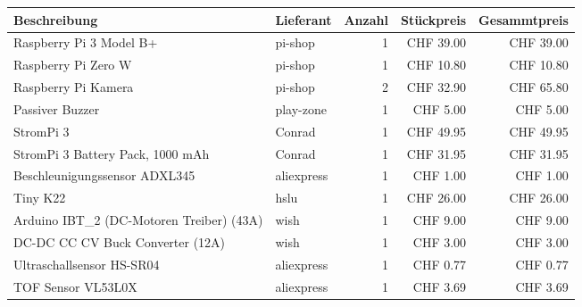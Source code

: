\documentclass[../../main.tex]{subfiles}
\begin{document}
\begin{table}[H]
    \centering
    \begin{tabular}{|p{6cm}|l|r|r|r|}
    \hline
    \textbf{Beschreibung}                                   & \textbf{Lieferant} & \textbf{Anzahl} & \textbf{Stückpreis} & \textbf{Gesammtpreis} \\ \hline 
    Raspberry Pi 3 Model B+                                 & pi-shop            & 1               & CHF 39.00           & CHF 39.00             \\ \hline 
    Raspberry Pi Zero W                                     & pi-shop            & 1               & CHF 10.80           & CHF 10.80             \\ \hline 
    Raspberry Pi Kamera                                     & pi-shop            & 2               & CHF 32.90           & CHF 65.80             \\ \hline 
    Passiver Buzzer                                         & play-zone          & 1               & CHF 5.00            & CHF 5.00              \\ \hline 
    StromPi 3                                               & Conrad             & 1               & CHF 49.95           & CHF 49.95             \\ \hline 
    StromPi 3 Battery Pack, 1000 mAh                        & Conrad             & 1               & CHF 31.95           & CHF 31.95             \\ \hline 
    Beschleunigungssensor ADXL345                           & aliexpress         & 1               & CHF 1.00            & CHF 1.00              \\ \hline 
    Tiny K22                                                & hslu               & 1               & CHF 26.00           & CHF 26.00             \\ \hline 
    Arduino IBT\_2 (DC-Motoren Treiber) (43A)               & wish               & 1               & CHF 9.00            & CHF 9.00              \\ \hline 
    DC-DC CC CV Buck Converter (12A)                        & wish               & 1               & CHF 3.00            & CHF 3.00              \\ \hline 
    Ultraschallsensor HS-SR04                               & aliexpress         & 1               & CHF 0.77            & CHF 0.77              \\ \hline 
    TOF Sensor VL53L0X                                      & aliexpress         & 1               & CHF 3.69            & CHF 3.69              \\ \hline 

\end{tabular}
\end{table}
\end{document}
